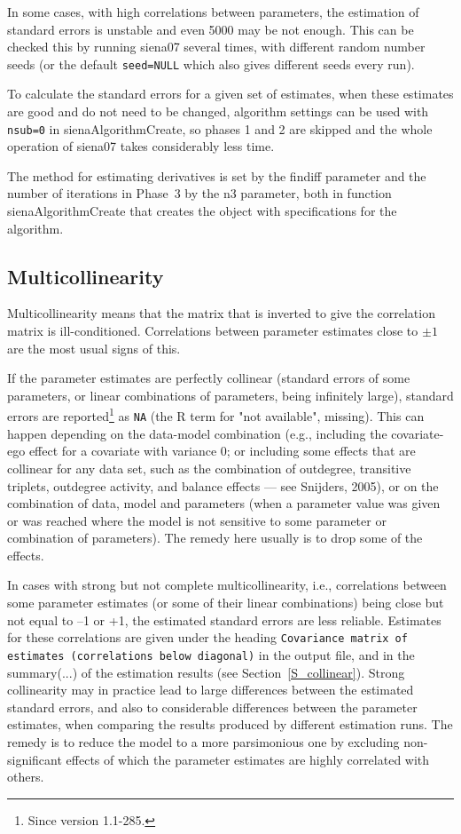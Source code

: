 \documentclass[a4paper,fleqn,11pt]{article}
\newcommand{\+}{\, + \,}
\newcommand{\sfn}[1]{\textsf{#1}}
\begin{document}
In some cases, with high correlations between parameters,
the estimation of standard errors is unstable and even 5000 may be not enough.
This can be checked this by running \textsf{siena07} several times, with different
random number seeds (or the default \texttt{seed=NULL} which also gives different
seeds every run).

To calculate the standard errors for a
given set of estimates, when these estimates are good and do not need to be changed,
algorithm settings can be used with \texttt{nsub=0}
in \sfn{sienaAlgorithmCreate}, so phases 1 and 2 are
skipped and the whole operation of \sfn{siena07} takes considerably less time.

The method for estimating derivatives is set
by the \sfn{findiff} parameter and the number of iterations in Phase~3
by the \sfn{n3} parameter, both in function \sfn{sienaAlgorithmCreate}
that creates the object with specifications for the algorithm.

\subsection{Multicollinearity}

Multicollinearity means that the matrix that is inverted
to give the correlation matrix is ill-conditioned.
Correlations between parameter estimates
close to $\pm 1$ are the most usual signs of this.

If the parameter estimates are perfectly collinear
(standard errors of some parameters, or linear combinations
of parameters, being infinitely large), standard errors
are reported\footnote{Since version 1.1-285.}
as \texttt{NA} (the R term for "not available", missing).
This can happen depending on the data-model combination
(e.g., including the covariate-ego effect for a covariate with variance 0;
or including some effects that are collinear for any data set,
such as the combination of outdegree, transitive triplets,
outdegree activity, and balance effects --- see Snijders, 2005),
or on the combination of data, model and parameters (when a parameter
value was given or was reached where the model is not sensitive to some
parameter or combination of parameters).
The remedy here usually is to drop some of the effects.
\medskip

In cases with strong but not complete multicollinearity,
i.e., correlations between some parameter estimates
(or some of their linear combinations) being close but not equal to --1 or +1,
the estimated standard errors are less reliable.
 Estimates for these correlations
are given under the heading
\texttt{Covariance matrix of estimates (correlations below diagonal)}
in the output file, and in the \textsf{summary(...)} of the estimation results
(see Section~\ref{S_collinear}).
Strong collinearity may in practice lead to large differences
between the estimated standard errors,
and also to considerable differences between the parameter estimates,
when comparing the results produced by different estimation runs.
The remedy is to reduce the model to a more parsimonious one
by excluding non-significant effects of which the parameter
estimates are highly correlated with others.
\end{document}
